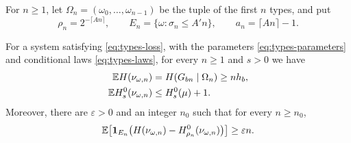 For $n\ge1$, let $\Omega_n=(\omega_0,\ldots,\omega_{n-1})$ be
the tuple of the first $n$ types, and put
\begin{equation}\label{eq:types-scales}
 \rho_n=2^{-\lceil An\rceil},
 \qquad E_n=\{\omega:\sigma_n\le A'n\},
 \qquad a_n=\lceil An\rceil-1.
\end{equation}

\begin{lemma}\label{lem:type-deficit}
For a system satisfying \eqref{eq:types-loss},
with the parameters
\eqref{eq:types-parameters} and conditional laws
\eqref{eq:types-laws}, for every $n\ge1$ and $s>0$ we have
\begin{align}
 \mathbb E H(\nu_{\omega,n})
 &=H(G_{bn}\mid\Omega_n)
 \ge nh_b,\label{eq:types-exact-entropy}\\
 \mathbb E H_s^0(\nu_{\omega,n})
 &\le H_s^0(\mu)+1.\label{eq:types-grid-entropy}
\end{align}
Moreover, there are $\varepsilon>0$ and an integer $n_0$ such that
for every $n\ge n_0$,
\begin{equation}\label{eq:types-deficit}
 \mathbb E\!\left[\mathbf1_{E_n}
    \bigl(H(\nu_{\omega,n})-H_{\rho_n}^0(\nu_{\omega,n})\bigr)
    \right]\ge\varepsilon n.
\end{equation}
\end{lemma}

